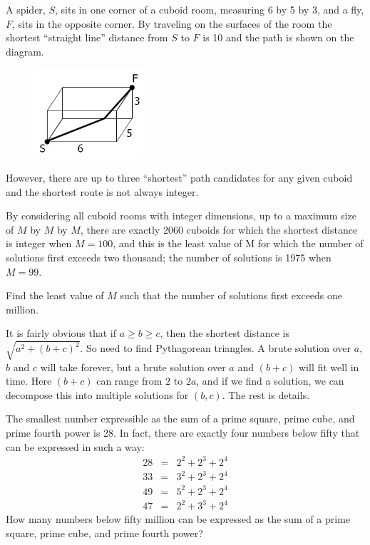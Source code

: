 A spider, $S$, sits in one corner of a cuboid room, measuring 6 by 5 by 3, and a fly, $F$, sits in the opposite corner. By traveling on the surfaces of the room the shortest ``straight line'' distance from $S$ to $F$ is 10 and the path is shown on the diagram.
\vspace{-0.5cm}
\begin{center}
\begin{figure}[h]
\centering
\includegraphics[width = 0.36\textwidth]{./images/p_086.png}
\end{figure}
\end{center}
\vspace{-1.2cm}
However, there are up to three ``shortest'' path candidates for any given cuboid and the shortest route is not always integer.

By considering all cuboid rooms with integer dimensions, up to a maximum size of $M$ by $M$ by $M$, there are exactly 2060 cuboids for which the shortest distance is integer when $M=100$, and this is the least value of M for which the number of solutions first exceeds two thousand; the number of solutions is 1975 when $M=99$.

Find the least value of $M$ such that the number of solutions first exceeds one million.

It is fairly obvious that if $a \geq b \geq c$, then the shortest distance is $\sqrt{a^2+(b+c)^2}$.  So need to find
Pythagorean triangles.  A brute solution over $a$, $b$ and $c$ will take forever, but a brute solution over
$a$ and $(b+c)$ will fit well in time.  Here $(b+c)$ can range from $2$ to $2a$, and if we find a solution, we can decompose this into multiple solutions for $(b,c)$.  The rest is details.




The smallest number expressible as the sum of a prime square, prime cube, and prime fourth power is 28. In fact, there are exactly four numbers below fifty that can be expressed in such a way:
\begin{eqnarray*}
28 &= &2^2 + 2^3 + 2^4 \\
33 &= &3^2 + 2^3 + 2^4 \\
49 &= &5^2 + 2^3 + 2^4 \\
47 &= &2^2 + 3^3 + 2^4
\end{eqnarray*}
How many numbers below fifty million can be expressed as the sum of a prime square, prime cube, and prime fourth power?

